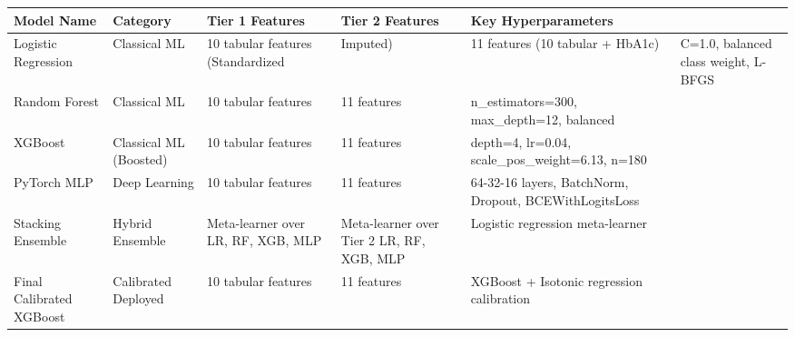 \begin{tabular}{lllll}
\toprule
Model Name & Category & Tier 1 Features & Tier 2 Features & Key Hyperparameters \\
\midrule
Logistic Regression & Classical ML & 10 tabular features (Standardized & Imputed) & 11 features (10 tabular + HbA1c) & C=1.0, balanced class weight, L-BFGS \\
Random Forest & Classical ML & 10 tabular features & 11 features & n_estimators=300, max_depth=12, balanced \\
XGBoost & Classical ML (Boosted) & 10 tabular features & 11 features & depth=4, lr=0.04, scale_pos_weight=6.13, n=180 \\
PyTorch MLP & Deep Learning & 10 tabular features & 11 features & 64-32-16 layers, BatchNorm, Dropout, BCEWithLogitsLoss \\
Stacking Ensemble & Hybrid Ensemble & Meta-learner over LR, RF, XGB, MLP & Meta-learner over Tier 2 LR, RF, XGB, MLP & Logistic regression meta-learner \\
Final Calibrated XGBoost & Calibrated Deployed & 10 tabular features & 11 features & XGBoost + Isotonic regression calibration \\
\bottomrule
\end{tabular}
